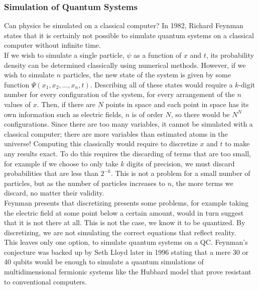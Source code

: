\documentclass[reqno]{amsart}
\numberwithin{equation}{section}
\numberwithin{figure}{section}
\begin{document}
\subsubsection{Simulation of Quantum Systems}
\begin{justify}
Can physics be simulated on a classical computer? In 1982, Richard Feynman states that it is certainly not possible to simulate quantum systems on a classical computer without infinite time. \cite{Feynman1982} \\

If we wish to simulate a single particle, $\psi$ as a function of $x$ and $t$, its probability density can be determined classically using numerical methods. \cite{Schroedinger1926} However, if we wish to simulate $n$ particles, the new state of the system is given by some function $\Psi(x_{1}, x_{2}, \ldots, x_{n}, t)$. Describing all of these states would require a $k$-digit number for every configuration of the system, for every arrangement of the $n$ values of $x$. Then, if there are $N$ points in space and each point in space has its own information such as electric fields, $n$ is of order $N$, so there would be $N^N$ configurations. Since there are too many variables, it cannot be simulated with a classical computer; there are more variables than estimated atoms in the universe! Computing this classically would require to discretize $x$ and $t$ to make any results exact. To do this requires the discarding of terms that are too small, for example if we choose to only take $k$ digits of precision, we must discard probabilities that are less than $2^{-k}$. This is not a problem for a small number of particles, but as the number of particles increases to $n$, the more terms we discard, no matter their validity. \\

Feynman presents that discretizing presents some problems, for example taking the electric field at some point below a certain amount, would in turn suggest that it is not there at all. This is not the case, we know it to be quantized. By discretizing, we are not simulating the correct equations that reflect reality. \\

This leaves only one option, to simulate quantum systems on a QC. Feynman's conjecture was backed up by Seth Lloyd later in 1996 \cite{Lloyd1996} stating that a mere 30 or 40 qubits would be enough to simulate a quantum simulations of multidimensional fermionic systems like the Hubbard model \cite{Hubbard1963} that prove resistant to conventional computers. \\
\end{justify}
\end{document}
